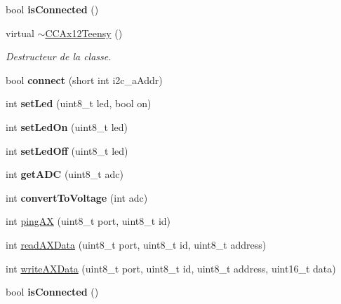\begin{DoxyCompactItemize}
\item 
\mbox{\label{classCCAx12Teensy_a3ba72ed4493b1ee0e3e39a06b258d202}} 
bool {\bfseries is\+Connected} ()
\item 
\mbox{\label{classCCAx12Teensy_a0efc6bc1842f2548ce94fa8f72dab7ac}} 
virtual \hyperlink{classCCAx12Teensy_a0efc6bc1842f2548ce94fa8f72dab7ac}{$\sim$\+C\+C\+Ax12\+Teensy} ()
\begin{DoxyCompactList}\small\item\em Destructeur de la classe. \end{DoxyCompactList}\item 
\mbox{\label{classCCAx12Teensy_a67a40bbeae8b21ed7b62ef504bb24788}} 
bool {\bfseries connect} (short int i2c\+\_\+a\+Addr)
\item 
\mbox{\label{classCCAx12Teensy_a743dbb935093a782f9985db895a1fc27}} 
int {\bfseries set\+Led} (uint8\+\_\+t led, bool on)
\item 
\mbox{\label{classCCAx12Teensy_aa3a9e62109ec26dbbeab2b3c69845163}} 
int {\bfseries set\+Led\+On} (uint8\+\_\+t led)
\item 
\mbox{\label{classCCAx12Teensy_aabde87b12a39781e684b537f674473df}} 
int {\bfseries set\+Led\+Off} (uint8\+\_\+t led)
\item 
\mbox{\label{classCCAx12Teensy_a156bd7d48da829aec67237d60c7be7a5}} 
int {\bfseries get\+A\+DC} (uint8\+\_\+t adc)
\item 
\mbox{\label{classCCAx12Teensy_ae46cd040e0c9d44a794c7f515b51e711}} 
int {\bfseries convert\+To\+Voltage} (int adc)
\item 
int \hyperlink{classCCAx12Teensy_a7a4be50ad46846c5a1d8a8bb80af6ce5}{ping\+AX} (uint8\+\_\+t port, uint8\+\_\+t id)
\item 
int \hyperlink{classCCAx12Teensy_a3b838fec3ab75c627fc03725f483599c}{read\+A\+X\+Data} (uint8\+\_\+t port, uint8\+\_\+t id, uint8\+\_\+t address)
\item 
int \hyperlink{classCCAx12Teensy_aad5eb7a2a208b355c8d84b853c362345}{write\+A\+X\+Data} (uint8\+\_\+t port, uint8\+\_\+t id, uint8\+\_\+t address, uint16\+\_\+t data)
\item 
\mbox{\label{classCCAx12Teensy_a3ba72ed4493b1ee0e3e39a06b258d202}} 
bool {\bfseries is\+Connected} ()
\end{DoxyCompactItemize}

